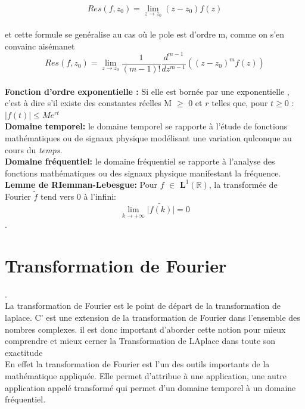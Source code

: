 \documentclass[12pt,a4paper]{report}
\begin{document}
\begin{displaymath}
 Res(f,z_0) =\lim_{z \rightarrow z_0} (z-z_0) f(z)
 \end{displaymath}
 \\
 et cette formule se genéralise au cas où le pole est d'ordre m, comme on s'en convainc aisémanet \\
 \begin{displaymath}
   Res(f,z_0)
   = \lim_{z \rightarrow z_0} \frac{1}{(m-1)!} \frac{d^{m-1}}{\mathit{dz^{m-1}}}((z-z_0)^{m}f(z))
 \end{displaymath}\\
 
\textbf{Fonction d'ordre exponentielle :} Si elle est bornée par une exponentielle , c'est à dire s'il existe des constantes réelles M $\geq$ 0 et $\mathit{r}$ telles que, pour $t\geq0$ :
  $\lvert f(t)\rvert \leq M e^{rt}$\\
  
\textbf{Domaine temporel:} le domaine temporel se rapporte à l'étude de fonctions mathématiques ou de signaux physique modélisant une variation qulconque au cours du \textit{temps.}\\
 
 \textbf{Domaine fréquentiel:} le domaine fréquentiel se rapporte à l'analyse des fonctions mathématiques ou des signaux  physique manifestant la fréquence.\\
 
 \textbf{Lemme de RIemman-Lebesgue:} Pour $f$ $\in$ $\mathbf{L}^{1}(\mathbb{R})$, la transformée de Fourier 
 $\tilde{f}$ tend vers 0 à l'infini:\\
 
 \[\underset{k \to +\infty}{\lim} \lvert \tilde{f(k)} \rvert  =0\]. 

\newpage
\section{ Transformation de Fourier}.\\
La transformation de Fourier est le point de départ de la transformation de laplace. C' est une extension de la transformation de Fourier dans l'ensemble des nombres complexes. il est donc important d'aborder cette notion pour mieux comprendre et mieux cerner la Transformation de LAplace dans toute son exactitude \\
 En effet la transformation de Fourier est l'un des outils importants de la mathématique appliquée. Elle  permet d'attribue à une application, une autre application appelé transformé qui permet d'un domaine temporel à un domaine fréquentiel.
\end{document}
